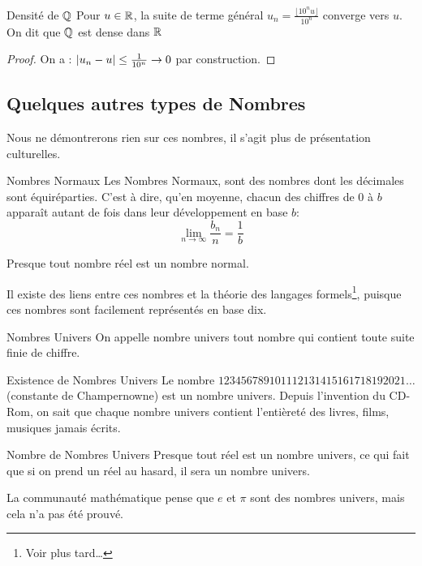 \documentclass{cours}
\begin{document}
    \begin{théorème}{Densité de $\mathbb{Q}$}{}
        Pour $u \in \mathbb{R}$, la suite de terme général $u_{n} = \frac{\lfloor 10^{n}u\rfloor}{10^{n}}$ converge vers $u$. On dit que $\mathbb{Q}$ est dense dans $\mathbb{R}$
    \end{théorème}
    \begin{proof}
        On a : $\left|u_{n} - u\right| \leq \frac{1}{10^{n}} \to 0$ par construction.
    \end{proof}

    \subsection{Quelques autres types de Nombres}
    Nous ne démontrerons rien sur ces nombres, il s'agit plus de présentation culturelles.
    \begin{définition}{Nombres Normaux}{}
        Les Nombres Normaux, sont des nombres dont les décimales sont équiréparties. C'est à dire, qu'en moyenne, chacun des chiffres de $0$ à $b$ apparaît autant de fois dans leur développement en base $b$: 
    \[
        \lim_{n \to \infty} \frac{b_{n}}{n} = \frac{1}{b}
    \]        
    \end{définition}

    Presque tout nombre réel est un nombre normal.

    Il existe des liens entre ces nombres et la théorie des langages formels\footnote{Voir plus tard\dots}, puisque ces nombres sont \og facilement \fg représentés en base dix.    

    \begin{définition}{Nombres Univers}{}
        On appelle nombre univers tout nombre qui contient toute suite finie de chiffre.
    \end{définition}

    \begin{propositionfr}{Existence de Nombres Univers}{}
        Le nombre $123456789101112131415161718192021\ldots$ (constante de Champernowne) est un nombre univers. Depuis l'invention du CD-Rom, on sait que chaque nombre univers contient l'entièreté des livres, films, musiques jamais écrits.
    \end{propositionfr}
    \begin{propositionfr}{Nombre de Nombres Univers}{}
        Presque tout réel est un nombre univers, ce qui fait que si on prend un réel au hasard, il sera un nombre univers.
    \end{propositionfr}
    \begin{remarque}{}{}
        La communauté mathématique pense que $e$ et $\pi$ sont des nombres univers, mais cela n'a pas été prouvé.
    \end{remarque}
\end{document}
